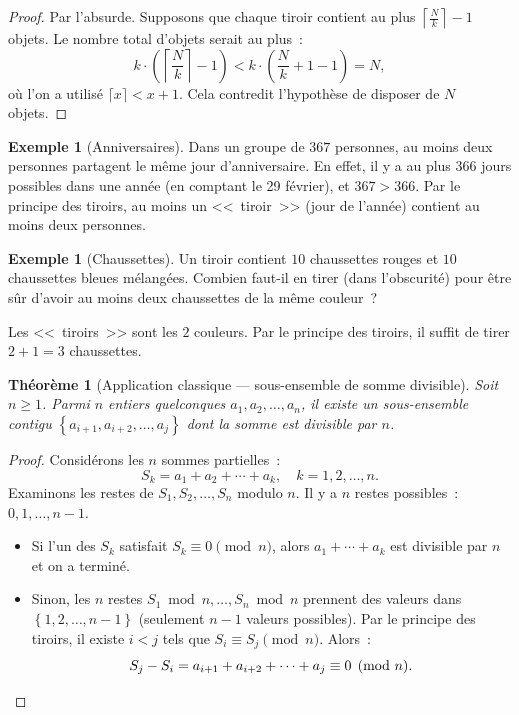\documentclass[12pt,a4paper,openany]{book}
\theoremstyle{definition}
\newtheorem{exemple}[definition]{Exemple}
\theoremstyle{plain}
\newtheorem{theoreme}[definition]{Théorème}
\theoremstyle{remark}
\newcommand{\set}[1]{\left\{#1\right\}}
\begin{document}
\begin{proof}
  Par l'absurde. Supposons que chaque tiroir contient au plus $\left\lceil \frac{N}{k} \right\rceil - 1$ objets. Le nombre total d'objets serait au plus~:
  \[
    k \cdot \left(\left\lceil \frac{N}{k} \right\rceil - 1\right)
    < k \cdot \left(\frac{N}{k} + 1 - 1\right)
    = N,
  \]
  o\`u l'on a utilis\'e $\lceil x \rceil < x + 1$. Cela contredit l'hypoth\`ese de disposer de $N$ objets.
\end{proof}

\begin{exemple}[Anniversaires]\label{ex:anniversaires}
  Dans un groupe de $367$ personnes, au moins deux personnes partagent le m\^eme jour d'anniversaire. En effet, il y a au plus $366$ jours possibles dans une ann\'ee (en comptant le 29 f\'evrier), et $367 > 366$. Par le principe des tiroirs, au moins un <<~tiroir~>> (jour de l'ann\'ee) contient au moins deux personnes.
\end{exemple}

\begin{exemple}[Chaussettes]\label{ex:chaussettes}
  Un tiroir contient $10$ chaussettes rouges et $10$ chaussettes bleues m\'elang\'ees. Combien faut-il en tirer (dans l'obscurit\'e) pour \^etre s\^ur d'avoir au moins deux chaussettes de la m\^eme couleur~?

  \smallskip
  Les <<~tiroirs~>> sont les $2$ couleurs. Par le principe des tiroirs, il suffit de tirer $2 + 1 = 3$ chaussettes.
\end{exemple}

\begin{theoreme}[Application classique --- sous-ensemble de somme divisible]\label{thm:somme-divisible}
  Soit $n \geq 1$. Parmi $n$ entiers quelconques $a_1, a_2, \dots, a_n$, il existe un sous-ensemble contigu $\set{a_{i+1}, a_{i+2}, \dots, a_j}$ dont la somme est divisible par $n$.
\end{theoreme}

\begin{proof}
  Consid\'erons les $n$ sommes partielles~:
  \[
    S_k = a_1 + a_2 + \cdots + a_k, \quad k = 1, 2, \dots, n.
  \]
  Examinons les restes de $S_1, S_2, \dots, S_n$ modulo $n$. Il y a $n$ restes possibles~: $0, 1, \dots, n-1$.
  \begin{itemize}
    \item Si l'un des $S_k$ satisfait $S_k \equiv 0 \pmod{n}$, alors $a_1 + \cdots + a_k$ est divisible par $n$ et on a termin\'e.
    \item Sinon, les $n$ restes $S_1 \bmod n, \dots, S_n \bmod n$ prennent des valeurs dans $\set{1, 2, \dots, n-1}$ (seulement $n-1$ valeurs possibles). Par le principe des tiroirs, il existe $i < j$ tels que $S_i \equiv S_j \pmod{n}$. Alors~:
    \[
      S_j - S_i = a_{i+1} + a_{i+2} + \cdots + a_j \equiv 0 \pmod{n}. \qedhere
    \]
  \end{itemize}
\end{proof}
\end{document}
